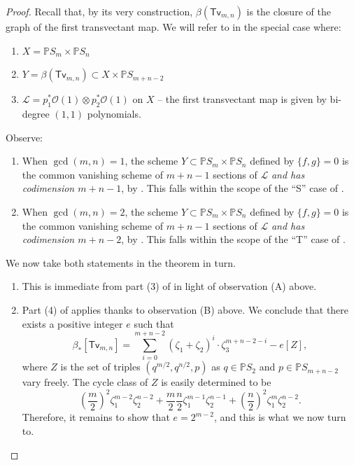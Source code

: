 \documentclass[reqno, 11pt]{amsart}
\theoremstyle{plain}
\theoremstyle{remark}
\renewcommand{\P}{\mathbb{P}}
\renewcommand{\O}{\mathscr{O}}
\renewcommand{\L}{\mathscr{L}}
\newcommand{\transvectant}{\mathsf{Tv}}
\begin{document}
    \begin{proof} Recall that, by its very construction, $\beta(\transvectant_{m,n})$ is the closure of the graph of the first transvectant map.  We will refer to  in the special case where: 
\begin{enumerate}
    \item $X = \P S_{m} \times \P S_{n}$
    \item $Y = \beta(\transvectant_{m,n}) \subset X \times \P S_{m+n-2}$
    \item $\L = p_1^{*}\O(1) \otimes p_2^{*}\O(1)$ on $X$ -- the first transvectant map is given by bi-degree $(1,1)$ polynomials.
\end{enumerate}

Observe: 
\begin{enumerate}
    \item[(A)] When $\gcd(m,n) = 1$, the scheme $Y \subset \P S_{m} \times \P S_{n}$ defined by $\{f,g\} = 0$ is the common vanishing scheme of $m+n-1$ sections of $\L$ {\sl and has codimension $m+n-1$}, by . This falls within the scope of the ``S'' case of .
    \item[(B)] When $\gcd(m,n) = 2$, the scheme $Y \subset \P S_{m} \times \P S_{n}$ defined by $\{f,g\} = 0$ is the common vanishing scheme of $m+n-1$ sections of $\L$ {\sl and has codimension $m+n-2$}, by . This falls within the scope of the ``T'' case of . 
\end{enumerate}

We now take both statements in the theorem in turn.


    \begin{enumerate}
        \item This is immediate from part (3) of  in light of observation (A) above.
        \item Part (4) of  applies thanks to observation (B) above.  We conclude that there exists a positive integer $e$ such that 
        \begin{equation}
            \beta_{*}[\transvectant_{m,n}] = \sum_{i=0}^{m+n-2} (\zeta_{1}+\zeta_{2})^{i} \cdot \zeta_{3}^{m+n-2-i} - e[Z],
        \end{equation}
        where $Z$ is the set of triples $(q^{m/2},q^{n/2},p)$ as $q \in \P S_{2}$ and $p \in \P S_{m+n-2}$ vary freely.  The cycle class of $Z$ is easily determined to be \[\left(\frac{m}{2}\right)^{2}\zeta_{1}^{m-2}\zeta_{2}^{n-2} + \frac{m}{2}\frac{n}{2}\zeta_{1}^{m-1}\zeta_{2}^{n-1} + \left(\frac{n}{2}\right)^{2}\zeta_{1}^{m}\zeta_{2}^{n-2}.\]  Therefore, it remains to show that $e = 2^{m-2}$, and this is what we now turn to.
    

\end{enumerate}
\end{proof}
\end{document}
